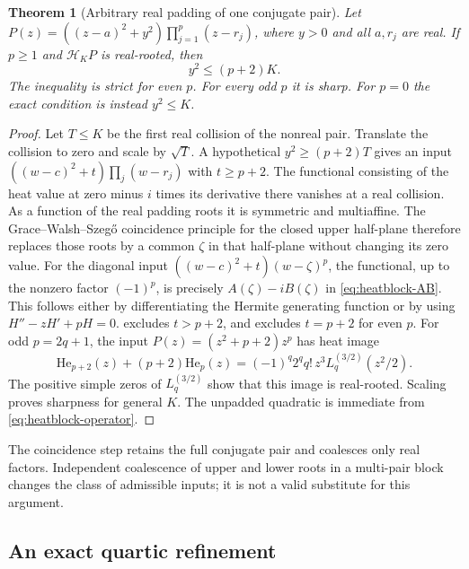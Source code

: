 \documentclass[11pt]{article}
\newtheorem{theorem}{Theorem}[section]
\theoremstyle{definition}
\theoremstyle{remark}
\begin{document}
\begin{theorem}[Arbitrary real padding of one conjugate pair]
\label{thm:heatblock-onepair}
Let
$P(z)=((z-a)^2+y^2)\prod_{j=1}^p(z-r_j)$, where $y>0$ and all
$a,r_j$ are real.  If $p\ge1$ and $\mathcal H_KP$ is real-rooted,
then
\begin{equation}
 y^2\le(p+2)K.
 \label{eq:heatblock-onepair}
\end{equation}
The inequality is strict for even $p$.  For every odd $p$ it is sharp.
For $p=0$ the exact condition is instead $y^2\le K$.
\end{theorem}

\begin{proof}
Let $T\le K$ be the first real collision of the nonreal pair.  Translate
the collision to zero and scale by $\sqrt T$.  A hypothetical
$y^2\ge(p+2)T$ gives an input
$((w-c)^2+t)\prod_j(w-r_j)$ with $t\ge p+2$.
The functional consisting of the heat value at zero minus $i$ times
its derivative there vanishes at a real collision.  As a function of
the real padding roots it is symmetric and multiaffine.  The
Grace--Walsh--Szeg\H{o} coincidence principle for the closed upper
half-plane therefore replaces those roots by a common
$\zeta$ in that half-plane without changing its zero value.
For the diagonal input $((w-c)^2+t)(w-\zeta)^p$, the functional,
up to the nonzero factor $(-1)^p$, is precisely $A(\zeta)-iB(\zeta)$
in \eqref{eq:heatblock-AB}.  This follows either by differentiating
the Hermite generating function or by using
$H''-zH'+pH=0$.   excludes
$t>p+2$, and excludes $t=p+2$ for even $p$.
For odd $p=2q+1$, the input
$P(z)=(z^2+p+2)z^p$ has heat image
\[
 \mathrm{He}_{p+2}(z)+(p+2)\mathrm{He}_p(z)
 =(-1)^q2^qq!\,z^3 L_q^{(3/2)}(z^2/2).
\]
The positive simple zeros of $L_q^{(3/2)}$ show that this image is
real-rooted.  Scaling proves sharpness for general $K$.
The unpadded quadratic is immediate from \eqref{eq:heatblock-operator}.
\end{proof}

The coincidence step retains the full conjugate pair and coalesces only
real factors.  Independent coalescence of upper and lower roots in a
multi-pair block changes the class of admissible inputs; it is not a
valid substitute for this argument.

\subsection{An exact quartic refinement}
\end{document}
